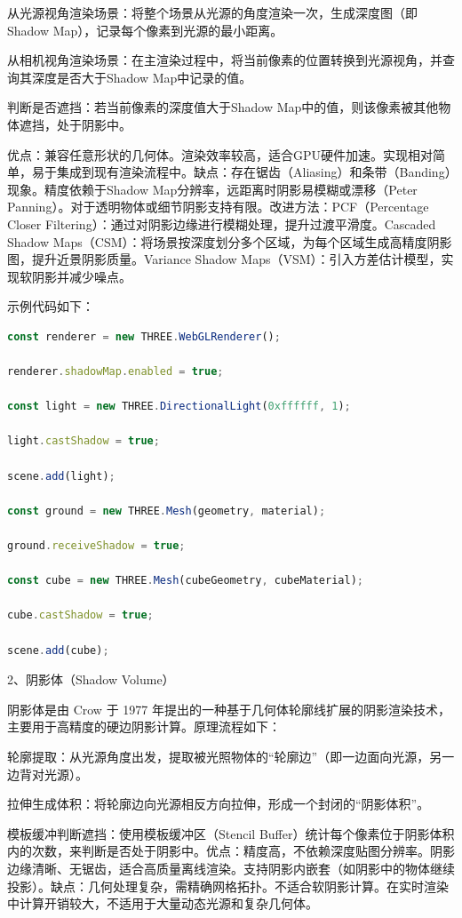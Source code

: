 从光源视角渲染场景：将整个场景从光源的角度渲染一次，生成深度图（即 Shadow Map），记录每个像素到光源的最小距离。

从相机视角渲染场景：在主渲染过程中，将当前像素的位置转换到光源视角，并查询其深度是否大于Shadow Map中记录的值。

判断是否遮挡：若当前像素的深度值大于Shadow Map中的值，则该像素被其他物体遮挡，处于阴影中。

优点：兼容任意形状的几何体。渲染效率较高，适合GPU硬件加速。实现相对简单，易于集成到现有渲染流程中。缺点：存在锯齿（Aliasing）和条带（Banding）现象。精度依赖于Shadow Map分辨率，远距离时阴影易模糊或漂移（Peter Panning）。对于透明物体或细节阴影支持有限。改进方法：PCF（Percentage Closer Filtering）：通过对阴影边缘进行模糊处理，提升过渡平滑度。Cascaded Shadow Maps（CSM）：将场景按深度划分多个区域，为每个区域生成高精度阴影图，提升近景阴影质量。Variance Shadow Maps（VSM）：引入方差估计模型，实现软阴影并减少噪点。

示例代码如下：

\begin{lstlisting}[language=Javascript]
const renderer = new THREE.WebGLRenderer();

renderer.shadowMap.enabled = true;

const light = new THREE.DirectionalLight(0xffffff, 1);

light.castShadow = true;

scene.add(light);

const ground = new THREE.Mesh(geometry, material);

ground.receiveShadow = true;

const cube = new THREE.Mesh(cubeGeometry, cubeMaterial);

cube.castShadow = true;

scene.add(cube);
\end{lstlisting}

2、阴影体（Shadow Volume）

阴影体是由 Crow 于 1977 年提出的一种基于几何体轮廓线扩展的阴影渲染技术，主要用于高精度的硬边阴影计算。原理流程如下：

轮廓提取：从光源角度出发，提取被光照物体的``轮廓边''（即一边面向光源，另一边背对光源）。

拉伸生成体积：将轮廓边向光源相反方向拉伸，形成一个封闭的``阴影体积''。

模板缓冲判断遮挡：使用模板缓冲区（Stencil Buffer）统计每个像素位于阴影体积内的次数，来判断是否处于阴影中。优点：精度高，不依赖深度贴图分辨率。阴影边缘清晰、无锯齿，适合高质量离线渲染。支持阴影内嵌套（如阴影中的物体继续投影）。缺点：几何处理复杂，需精确网格拓扑。不适合软阴影计算。在实时渲染中计算开销较大，不适用于大量动态光源和复杂几何体。

